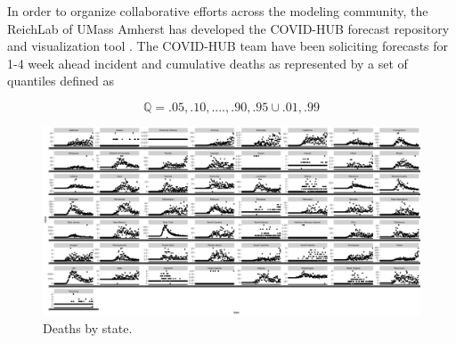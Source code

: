 \documentclass[11pt]{amsart}
\begin{document}
In order to organize collaborative efforts across the modeling community, the ReichLab of UMass Amherst has developed the COVID-HUB forecast repository and visualization tool \cite{covid-hub}. The COVID-HUB team have been soliciting forecasts for 1-4 week ahead incident and cumulative deaths as represented by a set of quantiles defined as 

\begin{equation}
\mathbb{Q} = {.05,.10,....,.90,.95} \cup {.01,.99}
\end{equation}





 \begin{figure}
     \centering
     \includegraphics[scale=.1]{data_plot.png}
     \caption{Deaths by state. }
     \label{fig:data}
 \end{figure}
 
\end{document}
